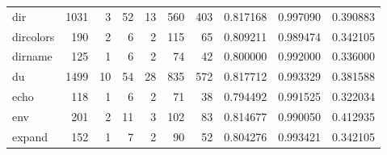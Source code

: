 \begin{tabular}{lrrrrrrrrr}
dir       &                   1031 &                                  3 &                                52 &                               13 &                               560 &                             403 &                                0.817168 &                               0.997090 &                             0.390883 \\
dircolors &                    190 &                                  2 &                                 6 &                                2 &                               115 &                              65 &                                0.809211 &                               0.989474 &                             0.342105 \\
dirname   &                    125 &                                  1 &                                 6 &                                2 &                                74 &                              42 &                                0.800000 &                               0.992000 &                             0.336000 \\
du        &                   1499 &                                 10 &                                54 &                               28 &                               835 &                             572 &                                0.817712 &                               0.993329 &                             0.381588 \\
echo      &                    118 &                                  1 &                                 6 &                                2 &                                71 &                              38 &                                0.794492 &                               0.991525 &                             0.322034 \\
env       &                    201 &                                  2 &                                11 &                                3 &                               102 &                              83 &                                0.814677 &                               0.990050 &                             0.412935 \\
expand    &                    152 &                                  1 &                                 7 &                                2 &                                90 &                              52 &                                0.804276 &                               0.993421 &                             0.342105 \\

\end{tabular}
